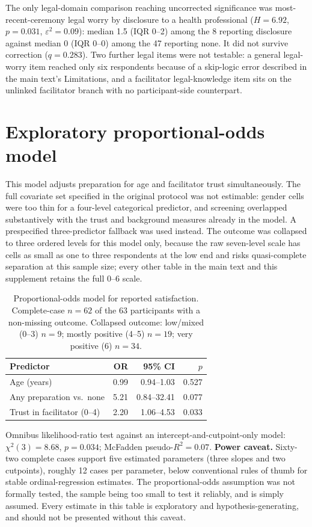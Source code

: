 \documentclass[12pt]{article}
\begin{document}
\noindent
The only legal-domain comparison reaching uncorrected significance was most-recent-ceremony legal worry by
disclosure to a health professional ($H=6.92$, $p=0.031$, $\varepsilon^2=0.09$): median 1.5 (IQR 0--2) among
the 8 reporting disclosure against median 0 (IQR 0--0) among the 47 reporting none. It did not survive
correction ($q=0.283$). Two further legal items were not testable: a general legal-worry item reached only
six respondents because of a skip-logic error described in the main text's Limitations, and a facilitator
legal-knowledge item sits on the unlinked facilitator branch with no participant-side counterpart.

\section{Exploratory proportional-odds model}

This model adjusts preparation for age and facilitator trust simultaneously. The full covariate set
specified in the original protocol was not estimable: gender cells were too thin for a four-level
categorical predictor, and screening overlapped substantively with the trust and background measures
already in the model. A prespecified three-predictor fallback was used instead. The outcome was collapsed
to three ordered levels for this model only, because the raw seven-level scale has cells as small as one to
three respondents at the low end and risks quasi-complete separation at this sample size; every other table
in the main text and this supplement retains the full 0--6 scale.

\begin{table}[htbp]
\centering
\caption{Proportional-odds model for reported satisfaction. Complete-case $n=62$ of the 63 participants
with a non-missing outcome. Collapsed outcome: low/mixed (0--3) $n=9$; mostly positive (4--5) $n=19$; very
positive (6) $n=34$.}
\begin{tabular}{lrrr}
\toprule
Predictor & OR & 95\% CI & $p$ \\
\midrule
Age (years) & 0.99 & 0.94--1.03 & 0.527 \\
Any preparation vs.\ none & 5.21 & 0.84--32.41 & 0.077 \\
Trust in facilitator (0--4) & 2.20 & 1.06--4.53 & 0.033 \\
\bottomrule
\end{tabular}
\end{table}

\noindent
Omnibus likelihood-ratio test against an intercept-and-cutpoint-only model: $\chi^2(3)=8.68$, $p=0.034$;
McFadden pseudo-$R^2=0.07$. \textbf{Power caveat.} Sixty-two complete cases support five estimated
parameters (three slopes and two cutpoints), roughly 12 cases per parameter, below conventional rules of
thumb for stable ordinal-regression estimates. The proportional-odds assumption was not formally tested,
the sample being too small to test it reliably, and is simply assumed. Every estimate in this table is
exploratory and hypothesis-generating, and should not be presented without this caveat.
\end{document}
